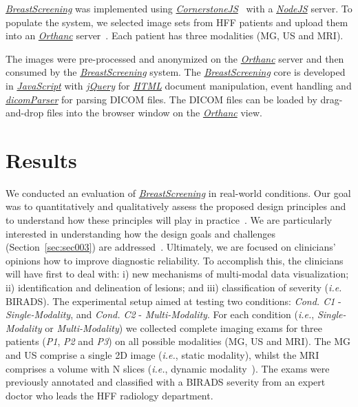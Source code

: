 \href{https://breastscreening.github.io/}{{\it BreastScreening}} was implemented using \href{https://cornerstonejs.org/}{{\it CornerstoneJS}}~\cite{urban2017lesiontracker} with a \href{https://nodejs.org/}{{\it NodeJS}} server.
To populate the system, we selected image sets from HFF patients and upload them into an \href{https://www.orthanc-server.com/}{{\it Orthanc}} server~\cite{Jodogne2018}.
Each patient has three modalities (MG, US and MRI).

The images were pre-processed and anonymized on the \href{https://www.orthanc-server.com/}{{\it Orthanc}} server and then consumed by the \href{https://breastscreening.github.io/}{{\it BreastScreening}} system.
The \href{https://breastscreening.github.io/}{{\it BreastScreening}} core is developed in \href{https://www.w3schools.com/js/}{{\it JavaScript}} with \href{https://www.w3schools.com/jquery/}{{\it jQuery}} for \href{https://www.w3schools.com/html/}{{\it HTML}} document manipulation, event handling and \href{https://github.com/cornerstonejs/dicomParser}{{\it dicomParser}} for parsing DICOM files.
The DICOM files can be loaded by drag-and-drop files into the browser window on the \href{https://www.orthanc-server.com/}{{\it Orthanc}} view. \section{Results}
\label{sec:sec005}

We conducted an evaluation of \href{https://breastscreening.github.io/}{{\it BreastScreening}} in real-world conditions.
Our goal was to quantitatively and qualitatively assess the proposed design principles and to understand how these principles will play in practice~\cite{10.1145/3027063.3027103}.
We are particularly interested in understanding how
the design goals and challenges (Section~\ref{sec:sec003}) are addressed~\cite{Veeraraghavan2018}.
Ultimately, we are focused on clinicians' opinions how to improve diagnostic reliability.
To accomplish this, the clinicians will have first to deal with:
i) new mechanisms of multi-modal data visualization;
ii) identification and delineation of lesions; and
iii) classification of severity ({\em i.e.} BIRADS).
The experimental setup aimed at testing two conditions:
\textit{Cond. C1} - \textit{Single-Modality}, and
\textit{Cond. C2} - \textit{Multi-Modality}.
For each condition ({\it i.e.}, {\it Single-Modality} or {\it Multi-Modality}) we collected complete imaging exams for three patients (\textit{P1}, \textit{P2} and \textit{P3}) on all possible modalities (MG, US and MRI).
The MG and US comprise a single 2D image ({\em i.e.}, static modality), whilst the MRI~\cite{8759179, SANTIAGO20189} comprises a volume with N slices ({\em i.e.}, dynamic modality~\cite{8296581}).
The exams were previously annotated and classified with a BIRADS severity from an expert doctor who leads the HFF radiology department.

